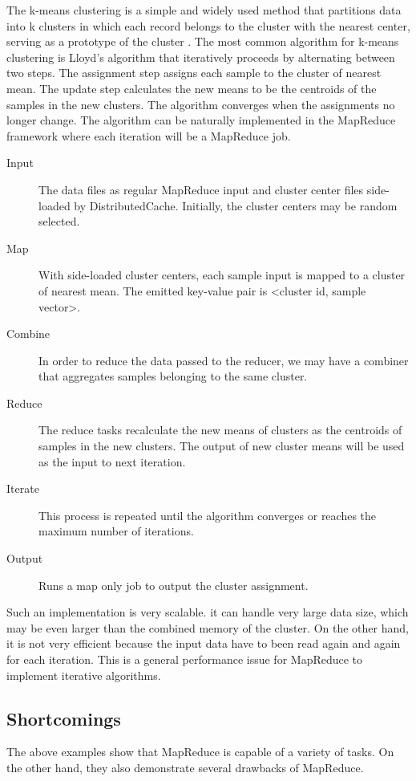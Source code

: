 \documentclass[12pt]{book}
\begin{document}
The k-means clustering is a simple and widely used method that partitions data into k clusters in which each record belongs to the cluster with the nearest center, serving as a prototype of the cluster \cite{Jain:1988:ACD}. The most common algorithm for k-means clustering is Lloyd's algorithm that iteratively proceeds by alternating between two steps. The assignment step assigns each sample to the cluster of nearest mean. The update step calculates the new means to be the centroids of the samples in the new clusters. The algorithm converges when the assignments no longer change. The algorithm can be naturally implemented in the MapReduce framework where each iteration will be a MapReduce job.
\begin{description}
\item[Input] The data files as regular MapReduce input and cluster center files side-loaded by DistributedCache. Initially, the cluster centers may be random selected.
\item[Map] With side-loaded cluster centers, each sample input is mapped to a cluster of nearest mean. The emitted key-value pair is \textless cluster id, sample vector\textgreater.
\item[Combine] In order to reduce the data passed to the reducer, we may have a combiner that aggregates samples belonging to the same cluster.
\item[Reduce] The reduce tasks recalculate the new means of clusters as the centroids of samples in the new clusters. The output of new cluster means will be used as the input to next iteration.
\item[Iterate] This process is repeated until the algorithm converges or reaches the maximum number of iterations.
\item[Output] Runs a map only job to output the cluster assignment.
\end{description}

Such an implementation is very scalable. it can handle very large data size, which may be even larger than the combined memory of the cluster. On the other hand, it is not very efficient because the input data have to been read again and again for each iteration. This is a general performance issue for MapReduce to implement iterative algorithms.
 
\subsection{Shortcomings}
The above examples show that MapReduce is capable of a variety of tasks. On the other hand, they also demonstrate several drawbacks of MapReduce.
\end{document}
